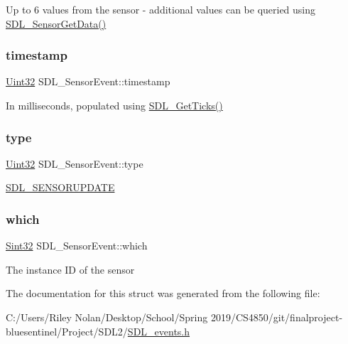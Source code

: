 Up to 6 values from the sensor -\/ additional values can be queried using \mbox{\hyperlink{_s_d_l__sensor_8h_a22466ee6b7af791937ebf1f7b76ed56b}{S\+D\+L\+\_\+\+Sensor\+Get\+Data()}} \mbox{\label{struct_s_d_l___sensor_event_a7de6c2b4d4791f5553b5de225293ceb5}} 
\subsubsection{\texorpdfstring{timestamp}{timestamp}}
{\footnotesize\ttfamily \mbox{\hyperlink{_s_d_l__stdinc_8h_add440eff171ea5f55cb00c4a9ab8672d}{Uint32}} S\+D\+L\+\_\+\+Sensor\+Event\+::timestamp}

In milliseconds, populated using \mbox{\hyperlink{_s_d_l__timer_8h_a0b9bc71d6287e0ffafdc3419760fe2b3}{S\+D\+L\+\_\+\+Get\+Ticks()}} \mbox{\label{struct_s_d_l___sensor_event_a0173d64fbe5299cad956298faf3fb0f9}} 
\subsubsection{\texorpdfstring{type}{type}}
{\footnotesize\ttfamily \mbox{\hyperlink{_s_d_l__stdinc_8h_add440eff171ea5f55cb00c4a9ab8672d}{Uint32}} S\+D\+L\+\_\+\+Sensor\+Event\+::type}

\mbox{\hyperlink{_s_d_l__events_8h_a3b589e89be6b35c02e0dd34a55f3fccaa1536ed6dfb1cdb20da84b7e2c602c022}{S\+D\+L\+\_\+\+S\+E\+N\+S\+O\+R\+U\+P\+D\+A\+TE}} \mbox{\label{struct_s_d_l___sensor_event_aa1c130192bad9b316f811f2d138b3b22}} 
\subsubsection{\texorpdfstring{which}{which}}
{\footnotesize\ttfamily \mbox{\hyperlink{_s_d_l__stdinc_8h_a7a90b941db9d4582e9ad7abb9940ff7e}{Sint32}} S\+D\+L\+\_\+\+Sensor\+Event\+::which}

The instance ID of the sensor 

The documentation for this struct was generated from the following file\+:\begin{DoxyCompactItemize}
\item 
C\+:/\+Users/\+Riley Nolan/\+Desktop/\+School/\+Spring 2019/\+C\+S4850/git/finalproject-\/bluesentinel/\+Project/\+S\+D\+L2/\mbox{\hyperlink{_s_d_l__events_8h}{S\+D\+L\+\_\+events.\+h}}\end{DoxyCompactItemize}
